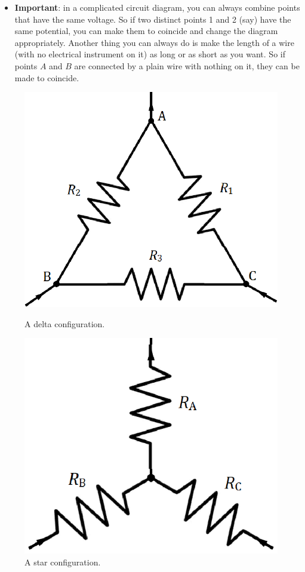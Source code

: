 \documentclass{scrartcl}
\begin{document}
    \begin{itemize}
        \item \textbf{Important}: in a complicated circuit diagram, you can always combine points that have the same voltage. So if two distinct points 1 and 2 (say) have the same potential, you can make them to coincide and change the diagram appropriately. Another thing you can always do is make the length of a wire (with no electrical instrument on it) as long or as short as you want. So if points $A$ and $B$ are connected by a plain wire with nothing on it, they can be made to coincide.
    \end{itemize}
    \begin{figure}[H]
        \centering
        \begin{minipage}[b]{0.4\textwidth}
            \includegraphics[width=\textwidth]{delta.eps}
            \caption{A delta configuration.}
        \end{minipage}
        \hfill
        \begin{minipage}[b]{0.4\textwidth}
            \includegraphics[width=\textwidth]{star.eps}
            \caption{A star configuration.}
        \end{minipage}
    \end{figure}
\end{document}

